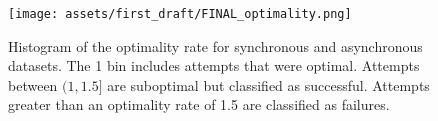 \begin{figure}[t!]
    \centering
    \texttt{[image: assets/first\_draft/FINAL\_optimality.png]}
    \caption{Histogram of the optimality rate for synchronous and asynchronous datasets. The 1 bin includes attempts that were optimal. Attempts between $(1, 1.5]$ are suboptimal but classified as successful. Attempts greater than an optimality rate of 1.5 are classified as failures.
    }
    \label{fig:histogram_optimality}
\end{figure}